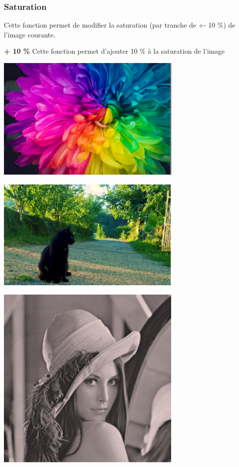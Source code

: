 \documentclass{article}
\begin{document}
\subsubsection{Saturation}

Cette fonction permet de modifier la saturation (par tranche de +- 10 \%) de l'image courante.

\textbf{+ 10 \%}
Cette fonction permet d'ajouter 10 \% à la saturation de l'image

\begin{center} 
    \includegraphics[width=9cm]{../Image_fonctions/Multicolor/Saturation+1.PNG}
\end{center}
\begin{center} 
    \includegraphics[width=9cm]{../Image_fonctions/Cat/Saturation+1.PNG}
\end{center}
\begin{center} 
    \includegraphics[width=9cm]{../Image_fonctions/Lenna/Saturation+1.PNG}
\end{center}
\end{document}
